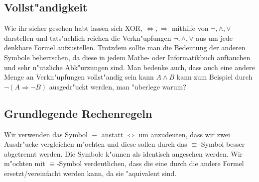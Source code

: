 \subsection{Vollst"andigkeit}
Wie ihr sicher gesehen habt lassen sich XOR, $\iff, \Rightarrow$ mithilfe von $\neg, \land, \lor$ darstellen und tats"achlich reichen die Verkn"upfungen $\neg, \land, \lor$ aus um jede denkbare Formel aufzustellen. Trotzdem sollte man die Bedeutung der anderen Symbole beherrschen, da diese in jedem Mathe- oder Informatikbuch auftauchen und sehr n"utzliche Abk"urzungen sind. Man bedenke auch, dass auch eine andere Menge an Verkn"upfungen vollst"andig sein kann $A \land B$ kann zum Beispiel durch $\neg (A \Rightarrow \neg B)$ ausgedr"uckt werden, man "uberlege warum?

\subsection{Grundlegende Rechenregeln}
Wir verwenden das Symbol $\equiv$ anstatt $\iff$ um anzudeuten, dass wir zwei Ausdr"ucke vergleichen m"ochten und diese sollen durch das $\equiv$-Symbol besser abgetrennt werden. Die Symbole k"onnen als identisch angesehen werden. Wir m"ochten mit $\equiv$-Symbol verdeutlichen, dass die eine durch die andere Formel ersetzt/vereinfacht werden kann, da sie "aquivalent sind.
